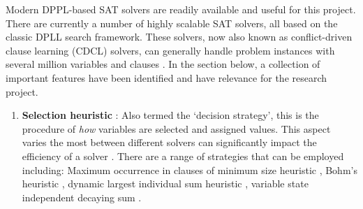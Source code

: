 \documentclass[11pt, a4paper, oneside]{report} %
\begin{document}
Modern DPPL-based SAT solvers are readily available and useful for this project.
There are currently a number of highly scalable SAT solvers, all based on the
classic DPLL search framework. These solvers, now also known as conflict-driven
clause learning (CDCL) solvers, can generally handle problem instances with
several million variables and clauses \cite{katebi2011empirical}. In the section
below, a collection of important features have been identified and have
relevance for the research project.

\begin{enumerate}


  \item \textbf{Selection heuristic} : \indent Also termed the `decision
strategy', this is the procedure of \textit{how} variables are selected and
assigned values. This aspect varies the most between different solvers can
significantly impact the efficiency of a solver
\cite{marques1999impact,gomes2008satisfiability, zhang2002quest}. There are a
range of strategies that can be employed including: Maximum occurrence in
clauses of minimum size heuristic \cite{jeroslow1990solving}, Bohm's heuristic
\cite{marques1999impact}, dynamic largest individual sum heuristic
\cite{marques1999grasp}, variable state independent decaying sum
\cite{moskewicz2001chaff}.







\end{enumerate}
\end{document}
